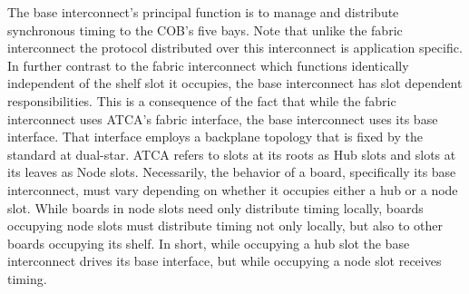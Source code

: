 The base interconnect's principal function is to manage and distribute synchronous timing to the COB's five bays. Note that unlike the fabric interconnect the protocol distributed over this interconnect is application specific. In further contrast to the fabric interconnect which functions identically independent of the shelf slot it occupies, the base interconnect has slot dependent responsibilities. This is a consequence of the fact that while the fabric interconnect uses ATCA's fabric interface, the base interconnect uses its base interface. That interface employs a backplane topology that is fixed by the standard at dual-star. ATCA refers to slots at its roots as Hub slots and slots at its leaves as Node slots. Necessarily, the behavior of a board, specifically its base interconnect, must vary depending on whether it occupies either a hub or a node slot. While boards in node slots need only distribute timing locally, boards occupying node slots must distribute timing not only locally, but also to other boards occupying its shelf. In short, while occupying a hub slot the base interconnect drives its base interface, but while occupying a node slot receives timing.


